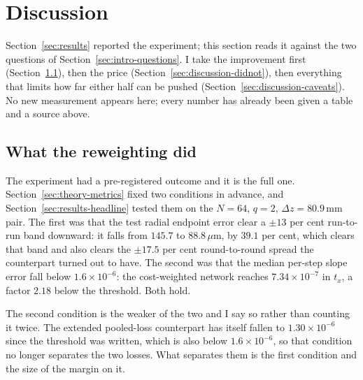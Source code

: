 \documentclass[11pt,a4paper]{article}
\newcommand{\um}{\ensuremath{\,\mu\mathrm{m}}}
\newcommand{\mm}{\ensuremath{\,\mathrm{mm}}}
\begin{document}
\section{Discussion}
\label{sec:discussion}

Section~\ref{sec:results} reported the experiment; this section reads it
against the two questions of Section~\ref{sec:intro-questions}. I take the
improvement first (Section~\ref{sec:discussion-did}), then the price
(Section~\ref{sec:discussion-didnot}), then everything that limits how far
either half can be pushed (Section~\ref{sec:discussion-caveats}). No new
measurement appears here; every number has already been given a table and a
source above.

\subsection{What the reweighting did}
\label{sec:discussion-did}

The experiment had a pre-registered outcome and it is the full one.
Section~\ref{sec:theory-metrics} fixed two conditions in advance, and
Section~\ref{sec:results-headline} tested them on the $N = 64$, $q = 2$,
$\Delta z = 80.9\mm$ pair. The first was that the test radial endpoint error
clear a $\pm 13$ per cent run-to-run band downward: it falls from $145.7$ to
$88.8\um$, by $39.1$ per cent, which clears that band and also clears the
$\pm 17.5$ per cent round-to-round spread the counterpart turned out to have.
The second was that the median per-step slope error fall below
$1.6\times10^{-6}$: the cost-weighted network reaches $7.34\times10^{-7}$ in
$t_x$, a factor $2.18$ below the threshold. Both hold.

The second condition is the weaker of the two and I say so rather than
counting it twice. The extended pooled-loss counterpart has itself fallen to
$1.30\times10^{-6}$ since the threshold was written, which is also below
$1.6\times10^{-6}$, so that condition no longer separates the two losses. What
separates them is the first condition and the size of the margin on it.
\end{document}
